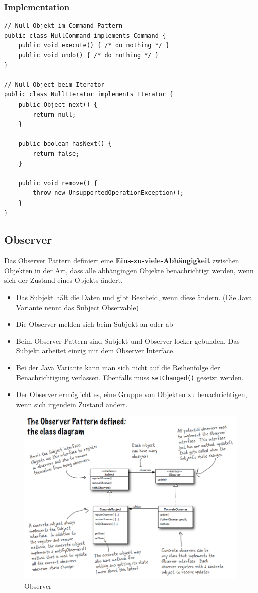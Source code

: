 \subsubsection{Implementation}
\begin{lstlisting}
// Null Objekt im Command Pattern
public class NullCommand implements Command {
	public void execute() { /* do nothing */ }
	public void undo() { /* do nothing */ }
}

// Null Object beim Iterator
public class NullIterator implements Iterator {
	public Object next() {
		return null;
	}
	
	public boolean hasNext() {
		return false;
	}
	
	public void remove() {
		throw new UnsupportedOperationException();
	}
}
\end{lstlisting}

\clearpage

\subsection{Observer}
\label{sec:observer}
Das Observer Pattern definiert eine \textbf{Eins-zu-viele-Abhängigkeit} zwischen Objekten in der Art, dass alle abhängingen Objekte benachrichtigt werden, wenn sich der Zustand eines Objekts ändert.
\begin{itemize}
	\item Das Subjekt hält die Daten und gibt Bescheid, wenn diese ändern. (Die Java Variante nennt das Subject Observable)
	\item Die Observer melden sich beim Subjekt an oder ab
	\item Beim Observer Pattern sind Subjekt und Observer locker gebunden. Das Subjekt arbeitet einzig mit dem Observer Interface.
	\item Bei der Java Variante kann man sich nicht auf die Reihenfolge der Benachrichtigung verlassen. Ebenfalls muss \lstinline|setChanged()| gesetzt werden.
	\item Der Observer ermöglicht es, eine Gruppe von Objekten zu benachrichtigen, wenn sich irgendein Zustand ändert.
\end{itemize}

\begin{figure}[h]
	\centering
	\includegraphics[width=0.65\linewidth]{images/observer_pattern}
	\caption{Observer}
	\label{fig:observerpattern}
\end{figure}

